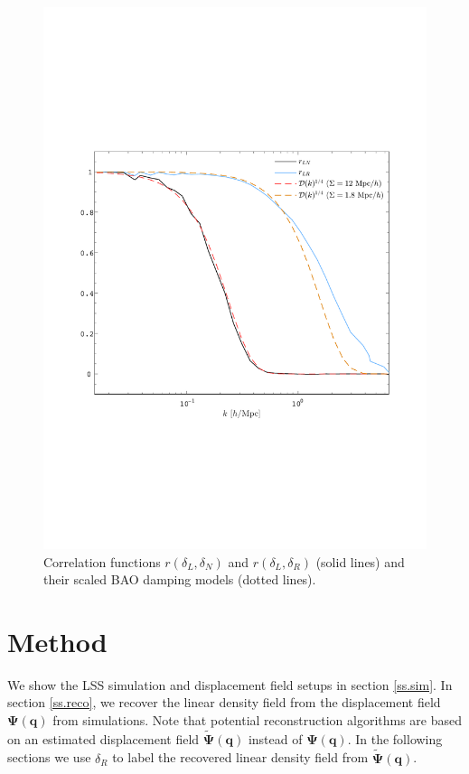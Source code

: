 \documentclass[aps,prd,twocolumn,superscriptaddress,amsfont,amssymb,amsmath,nofootinbib,showpacs,balancelastpage]{revtex4-1}
\newcommand{\bs}{\boldsymbol}
\begin{document}
\begin{figure}[t] \centering
  \includegraphics[width=1.0\linewidth]{filter.pdf}
  \caption{Correlation functions $r(\delta_L,\delta_N)$ and $r(\delta_L,\delta_R)$
  (solid lines) and their scaled BAO damping models (dotted lines).}
  \label{fig.corr}
\end{figure}



\section{Method}\label{sec.method}
We show the LSS simulation and displacement field setups in section \ref{ss.sim}.
In section \ref{ss.reco}, we recover the linear density field from the
displacement field $\bs\Psi(\bs q)$ from simulations.
Note that potential reconstruction algorithms are
based on an estimated displacement field $\tilde{\bs \Psi}(\bs q)$
instead of $\bs\Psi(\bs q)$. In the following sections we
use $\delta_R$ to label the recovered linear density field
from $\tilde{\bs \Psi}(\bs q)$.
\end{document}
